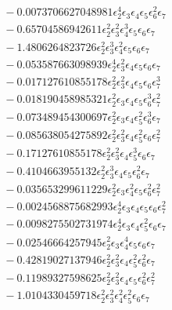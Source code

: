 \documentclass[10pt]{article}
\begin{document}
\begin{align*}
&{}  - 0.0073706627048981 \epsilon_{2}^{4} \epsilon_{3} \epsilon_{4} \epsilon_{5} \epsilon_{6}^{2} \epsilon_{7} \\
&{}  - 0.65704586942611 \epsilon_{2}^{2} \epsilon_{3}^{2} \epsilon_{4}^{3} \epsilon_{5} \epsilon_{6} \epsilon_{7} \\
&{}  - 1.4806264823726 \epsilon_{2}^{2} \epsilon_{3}^{3} \epsilon_{4}^{2} \epsilon_{5} \epsilon_{6} \epsilon_{7} \\
&{}  - 0.053587663098939 \epsilon_{2}^{4} \epsilon_{3}^{2} \epsilon_{4} \epsilon_{5} \epsilon_{6} \epsilon_{7} \\
&{}  - 0.017127610855178 \epsilon_{2}^{2} \epsilon_{3}^{2} \epsilon_{4} \epsilon_{5} \epsilon_{6} \epsilon_{7}^{3} \\
&{}  - 0.018190458985321 \epsilon_{2}^{2} \epsilon_{3} \epsilon_{4} \epsilon_{5} \epsilon_{6}^{3} \epsilon_{7}^{2} \\
&{}  - 0.073489454300697 \epsilon_{2}^{2} \epsilon_{3} \epsilon_{4} \epsilon_{5}^{2} \epsilon_{6}^{3} \epsilon_{7} \\
&{}  - 0.085638054275892 \epsilon_{2}^{2} \epsilon_{3}^{2} \epsilon_{4} \epsilon_{5}^{2} \epsilon_{6} \epsilon_{7}^{2} \\
&{}  - 0.17127610855178 \epsilon_{2}^{2} \epsilon_{3}^{2} \epsilon_{4} \epsilon_{5}^{3} \epsilon_{6} \epsilon_{7} \\
&{}  - 0.4104663955132 \epsilon_{2}^{2} \epsilon_{3}^{3} \epsilon_{4} \epsilon_{5} \epsilon_{6}^{2} \epsilon_{7} \\
&{}  - 0.035653299611229 \epsilon_{2}^{2} \epsilon_{3} \epsilon_{4}^{2} \epsilon_{5} \epsilon_{6}^{2} \epsilon_{7}^{2} \\
&{}  - 0.0024568875682993 \epsilon_{2}^{4} \epsilon_{3} \epsilon_{4} \epsilon_{5} \epsilon_{6} \epsilon_{7}^{2} \\
&{}  - 0.0098275502731974 \epsilon_{2}^{4} \epsilon_{3} \epsilon_{4} \epsilon_{5}^{2} \epsilon_{6} \epsilon_{7} \\
&{}  - 0.02546664257945 \epsilon_{2}^{2} \epsilon_{3} \epsilon_{4}^{4} \epsilon_{5} \epsilon_{6} \epsilon_{7} \\
&{}  - 0.42819027137946 \epsilon_{2}^{2} \epsilon_{3}^{2} \epsilon_{4} \epsilon_{5}^{2} \epsilon_{6}^{2} \epsilon_{7} \\
&{}  - 0.11989327598625 \epsilon_{2}^{2} \epsilon_{3}^{2} \epsilon_{4} \epsilon_{5} \epsilon_{6}^{2} \epsilon_{7}^{2} \\
&{}  - 1.0104330459718 \epsilon_{2}^{2} \epsilon_{3}^{2} \epsilon_{4}^{2} \epsilon_{5}^{2} \epsilon_{6} \epsilon_{7} \\

\end{align*}
\end{document}
